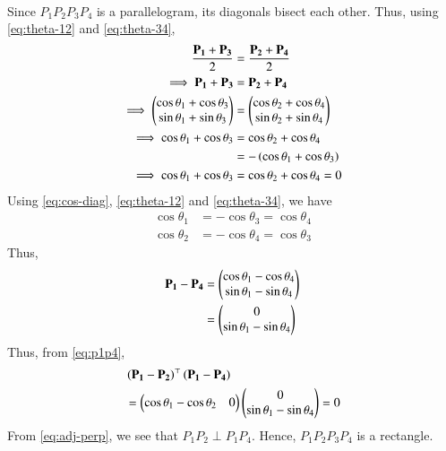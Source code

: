 \documentclass[journal,12pt,twocolumn]{IEEEtran}
\renewcommand{\vec}[1]{\boldsymbol{\mathbf{#1}}}
\begin{document}
\begin{enumerate}
\begin{align}
    \end{align}
    Since $P_1P_2P_3P_4$ is a parallelogram, its diagonals bisect each other. 
    Thus, using \eqref{eq:theta-12} and \eqref{eq:theta-34},
    \begin{align}
        \frac{\vec{P_1}+\vec{P_3}}{2} &= \frac{\vec{P_2}+\vec{P_4}}{2} \\
        \implies \vec{P_1}+\vec{P_3} &= \vec{P_2}+\vec{P_4} \\
        \implies \myvec{\cos\theta_1+\cos\theta_3\\\sin\theta_1+\sin\theta_3} &= \myvec{\cos\theta_2+\cos\theta_4\\\sin\theta_2+\sin\theta_4} \\
        \implies \cos\theta_1+\cos\theta_3 &= \cos\theta_2+\cos\theta_4 \\
                                           &= -\brak{\cos\theta_1+\cos\theta_3} \\
        \implies \cos\theta_1+\cos\theta_3 &= \cos\theta_2+\cos\theta_4 = 0
        \label{eq:cos-diag}
    \end{align}
    Using \eqref{eq:cos-diag}, \eqref{eq:theta-12} and \eqref{eq:theta-34}, we have
    \begin{align}
        \cos\theta_1 &= -\cos\theta_3 = \cos\theta_4 \\
        \cos\theta_2 &= -\cos\theta_4 = \cos\theta_3
        \label{eq:theta-14-23}
    \end{align}
    Thus,
    \begin{align}
        \vec{P_1} - \vec{P_4} &= \myvec{\cos\theta_1-\cos\theta_4\\\sin\theta_1-\sin\theta_4} \\
                              &= \myvec{0\\\sin\theta_1-\sin\theta_4}
                              \label{eq:p1p4}
    \end{align}
    Thus, from \eqref{eq:p1p4},
    \begin{align}
        &\brak{\vec{P_1}-\vec{P_2}}^\top\brak{\vec{P_1}-\vec{P_4}} \nonumber \\
        &= \myvec{\cos\theta_1-\cos\theta_2&0}\myvec{0\\\sin\theta_1-\sin\theta_4} = 0
        \label{eq:adj-perp}
    \end{align}
    From \eqref{eq:adj-perp}, we see that $P_1P_2 \perp P_1P_4$. Hence, $P_1P_2P_3P_4$ is
    a rectangle.


\end{enumerate}
\end{document}
